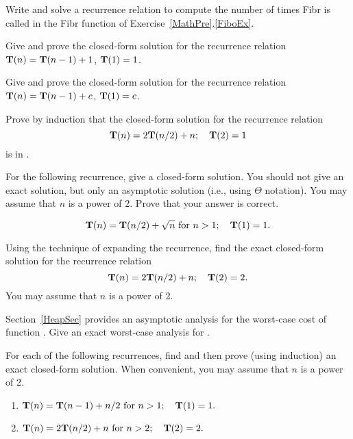 \begin{exercises}
\item
Write and solve a recurrence relation to compute the number of times
Fibr is called in the Fibr function of Exercise~\ref{MathPre}.\ref{FiboEx}.

\item
Give and prove the closed-form solution for the
recurrence relation
${\bf T}(n) = {\bf T}(n-1) + 1$, ${\bf T}(1) = 1$.

\item
Give and prove the closed-form solution for the
recurrence relation
${\bf T}(n) = {\bf T}(n-1) + c$, ${\bf T}(1) = c$.

\item
Prove by induction that the closed-form solution for
the recurrence relation
\[{\bf T}(n) = 2{\bf T}(n/2) + n; \quad {\bf T}(2) = 1\]
\noindent is in \Omeganlogn.

\item %
For the following recurrence, give a closed-form solution.
You should not give an exact solution, but only an asymptotic solution
(i.e., using \(\Theta\) notation).
You may assume that \(n\) is a power of 2.
Prove that your answer is correct.

\[\Tn = \Tnhalf + \sqrt{n}\ \mbox{for}\ n>1; \quad \Tone = 1. \]

\item
Using the technique of expanding the recurrence, find the exact
closed-form solution for the recurrence
relation
\[{\bf T}(n) = 2{\bf T}(n/2) + n; \quad {\bf T}(2) = 2.\]
\noindent You may assume that \(n\) is a power of 2.

\item
Section~\ref{HeapSec} provides an asymptotic analysis for the
worst-case cost of function .
Give an exact worst-case analysis for .

\item
For each of the following recurrences, find and then prove (using
induction) an exact closed-form solution.
When convenient, you may assume that \(n\) is a power of 2.

\begin{enumerate}
\item %
\(\Tn = \Tnone + n/2\ \mbox{for}\ n>1; \quad \Tone = 1.\)
\item
\(\Tn = 2\Tnhalf + n\ \mbox{for}\ n>2; \quad \Ttwo = 2. \)
\end{enumerate}


\end{exercises}
